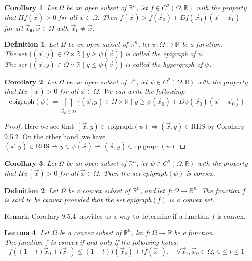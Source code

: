 \documentclass[15pt]{book}
\theoremstyle{break}
\theoremstyle{break}
\newtheorem{lem}{Lemma}[thm]
\newtheorem{corT}[lem]{Corollary}
\newtheorem{defn}{Definition}[corL]
\newcommand{\R}{\mathbb{R}}
\newcommand{\remark}{\color{blue}Remark: \color{black}}
\begin{document}
\begin{corT}
Let $\Omega$ be an open subset of $\R^n$, let $f \in C^2(\Omega, \R)$ with the property that $Hf(\vec{x})> 0$ for all $\vec{x}\in \Omega$. Then $f(\vec{x}) > f(\vec{x}_0) + Df(\vec{x}_0)(\vec{x}-\vec{x}_0)$ for all $\vec{x}_0,\vec{x}\in \Omega$ with $\vec{x}_0 \neq \vec{x}$.
\end{corT}


\begin{defn}
Let $\Omega$ be an open subset of $\R^n$, let $\psi : \Omega \to \R$ be a function. \\
The set $\{(\vec{x},y) \in \Omega \times \R \mid y \geq \psi(\vec{x})\}$ is called the epigraph of $\psi$. \\
The set $\{(\vec{x},y) \in \Omega \times \R \mid y \leq \psi(\vec{x})\}$ is called the hypergraph of $\psi$.
\end{defn}


\begin{corT}
Let $\Omega$ be an open subset of $\R^n$, let $\psi \in C^2(\Omega, \R)$ with the property that $H\psi(\vec{x})> 0$ for all $\vec{x}\in \Omega$. We can write the following:
$$\text{epigraph}(\psi) = \bigcap_{\vec{x}_0 \in \Omega} \{ (\vec{x},y) \in \Omega \times \R \mid y\geq \psi(\vec{x}_0)+D\psi (\vec{x}_0) (\vec{x}-\vec{x}_0)\}$$
\end{corT}
\begin{proof}
Here we see that $(\vec{x},y) \in \text{epigraph}(\psi) \Rightarrow (\vec{x},y) \in \text{RHS}$ by Corollary 9.5.2. On the other hand, we have $(\vec{x},y) \in \text{RHS} \Rightarrow y \in \psi(\vec{x}) \Rightarrow (\vec{x},y) \in \text{epigraph}(\psi)$
\end{proof}

\begin{corT}
Let $\Omega$ be an open subset of $\R^n$, let $\psi \in C^2(\Omega, \R)$ with the property that $H\psi(\vec{x})> 0$ for all $\vec{x}\in \Omega$. Then the set epigraph$(\psi)$ is convex.
\end{corT}

\begin{defn}
Let $\Omega$ be a convex subset of $\R^n$, and let $f: \Omega \to \R^n$. The function $f$ is said to be convex provided that the set epigraph$(f)$ is a convex set.
\end{defn}

\remark Corollary 9.5.4 provides us a way to determine if a function $f$ is convex.


\begin{lem}
Let $\Omega$ be a convex subset of $\R^n$, let $f : \Omega \to \R$ be a function. \\ The function $f$ is convex if and only if the following holds: 
$$f((1-t)\vec{x}_0 + t\vec{x}_1) \leq (1-t)f(\vec{x}_0) + tf(\vec{x}_1),\quad \forall \vec{x}_1,\vec{x}_0 \in \Omega,\ 0\leq t \leq 1$$
\end{lem}
\end{document}
